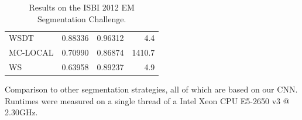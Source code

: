 \begin{table}[t]
\begin{subtable}[t!]{0.48\textwidth}
\begin{tabular}{l c c r}
            WSDT     & 0.88336   & 0.96312 & 4.4 \\
            MC-LOCAL & 0.70990   & 0.86874 & 1410.7 \\
            WS       & 0.63958   & 0.89237 & 4.9 \\
        \end{tabular}
        \caption{Comparison to other segmentation strategies, all of which are based on our CNN. Runtimes were measured on a single thread of a Intel Xeon CPU E5-2650 v3 @ 2.30GHz.}
        \label{tab:isbi-baselines}
    \end{subtable}
    \caption{Results on the ISBI 2012 EM Segmentation Challenge.}
    \label{tab:isbi-results}
\end{table}

